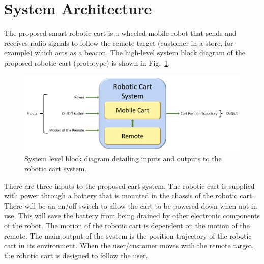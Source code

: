 \documentclass[conference]{IEEEtran}
\begin{document}
\section{System Architecture}
\label{sec:systemArchitecture}
The proposed smart robotic cart is a wheeled mobile robot that sends and
receives radio signals to follow the remote target (customer in a store, for
example) which acts as a beacon. The high-level system block diagram of the
proposed robotic cart (prototype) is shown in Fig.~\ref{fig:sys_block_diag}. %
% 
\begin{figure}[htbp]
  \centering
  \includegraphics[scale=0.2]{figs/systemBlockDiagram.pdf}
  \caption{System level block diagram detailing inputs and outputs to the
    robotic cart system.}
	\label{fig:sys_block_diag}
\end{figure}
% 
There are three inputs to the proposed cart system. The robotic cart is supplied
with power through a battery that is mounted in the chassis of the robotic cart.
There will be an on/off switch to allow the cart to be powered down when not in
use. This will save the battery from being drained by other electronic
components of the robot. The motion of the robotic cart is dependent on the
motion of the remote. The main output of the system is the position trajectory
of the robotic cart in its environment. When the user/customer moves with the
remote target, the robotic cart is designed to follow the user.
\end{document}
